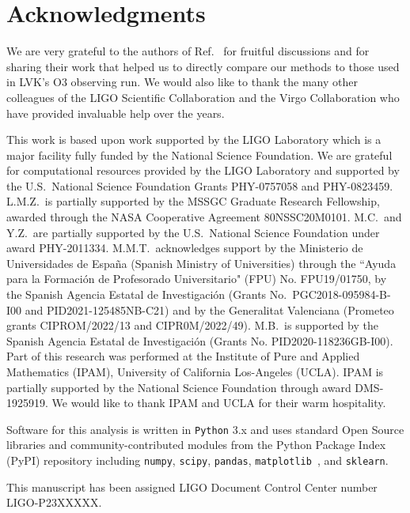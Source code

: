 \section*{Acknowledgments}

We are very grateful to the authors of Ref.~\cite{Chatterjee:2019avs} for fruitful discussions and for sharing their work that helped us to directly compare
our methods to those used in \ac{LVK}'s \ac{O3} observing run. We would also like to thank the many other colleagues of the LIGO Scientific Collaboration and
the Virgo Collaboration who have provided invaluable help over the years.

This work is based upon work supported by the LIGO Laboratory which is a major facility fully funded by the National Science Foundation. We are grateful for
computational resources provided by the LIGO Laboratory and supported by the U.S.\ National Science Foundation Grants PHY-0757058 and PHY-0823459. L.M.Z.\ is partially
supported by the MSSGC Graduate Research Fellowship, awarded through the NASA Cooperative Agreement 80NSSC20M0101. M.C.\ and Y.Z.\ are partially supported by the U.S.\
National Science Foundation under award PHY-2011334. M.M.T.\ acknowledges support by the Ministerio de Universidades de España (Spanish Ministry of Universities) through the ``Ayuda para la Formaci\'on de Profesorado Universitario" (FPU) No. FPU19/01750, by the
Spanish Agencia Estatal de Investigaci\'on (Grants No.\ PGC2018-095984-B-I00 and PID2021-125485NB-C21) and by the Generalitat Valenciana (Prometeo grants CIPROM/2022/13 and CIPR0M/2022/49).
M.B.\ is supported by the Spanish Agencia Estatal de Investigaci\'on (Grants No. PID2020-118236GB-I00). Part of this research was performed at the Institute of Pure and
Applied Mathematics (IPAM),  University of California Los-Angeles (UCLA). IPAM is partially supported by the National Science Foundation through award
DMS-1925919. We would like to thank IPAM and UCLA for their warm hospitality. 

Software for this analysis is written in \texttt{Python} 3.x  and uses standard Open Source libraries and community-contributed modules from the Python Package Index (PyPI) repository  including \texttt{numpy}, \texttt{scipy}, \texttt{pandas}, \texttt{matplotlib}~\cite{Hunter:2007ouj}, and \texttt{sklearn}.

This manuscript has been assigned LIGO Document Control Center number LIGO-P23XXXXX.





